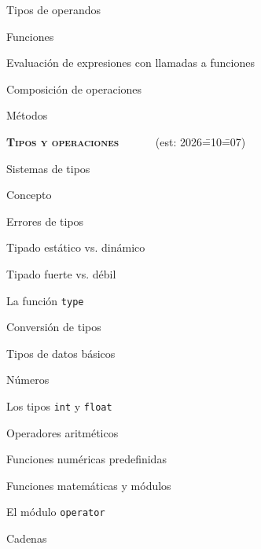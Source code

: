 \begin{longenum}
\begin{longenum}
\begin{longenum}
\begin{longenum}
                \item Tipos de operandos
            \end{longenum}
            \item Funciones
            \begin{longenum}
                \item Evaluación de expresiones con llamadas a funciones
                \item Composición de operaciones
            \end{longenum}
            \item Métodos
        \end{longenum}
    \end{longenum}
    \item \textbf{\textsc{Tipos y operaciones}} \ \ \ \ \ \ (est: 2026\==10\==07)
    \begin{longenum}
        \item Sistemas de tipos
        \begin{longenum}
            \item Concepto
            \item Errores de tipos
            \item Tipado estático vs. dinámico
            \item Tipado fuerte vs. débil
            \item La función \texttt{type}
            \item Conversión de tipos
            \item Tipos de datos básicos
        \end{longenum}
        \item Números
        \begin{longenum}
            \item Los tipos \texttt{int} y \texttt{float}
            \item Operadores aritméticos
            \item Funciones numéricas predefinidas
            \item Funciones matemáticas y módulos
            \begin{longenum}
                \item El módulo \texttt{operator}
            \end{longenum}
        \end{longenum}
        \item Cadenas
        \begin{longenum}

\end{longenum}
\end{longenum}
\end{longenum}
